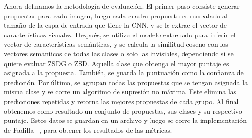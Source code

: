 Ahora definamos la metodología de evaluación. El primer paso consiste generar propuestas para cada imagen, luego cada cuadro propuesto es reescalado al tamaño de la capa de entrada que tiene la CNN, y se le extrae el vector de características visuales. Después, se utiliza el modelo entrenado para inferir el vector de características semánticas, y se calcula la similitud coseno con los vectores semánticos de todas las clases o solo las invisibles, dependiendo si se quiere evaluar ZSDG o ZSD. Aquella clase que obtenga el mayor puntaje es asignada a la propuesta. También, se guarda la puntuación como la confianza de predicción.  Por último, se agrupan todas las propuestas que se tengan asignada la misma clase y se corre un algoritmo de supresión no máxima. Este elimina las predicciones repetidas y retorna las mejores propuestas de cada grupo. Al final obtenemos como resultado un conjunto de propuestas, sus clases y su respectivo puntaje. Estos datos se guardan en un archivo y luego se corre la implementación de Padilla \etal~\cite{padilla2020survey}, para obtener los resultados de las métricas.\\
